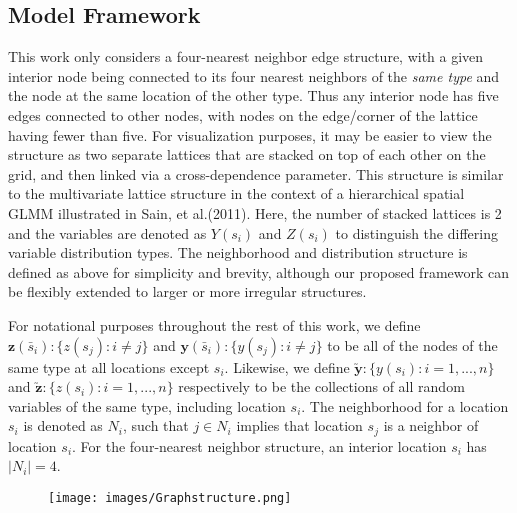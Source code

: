 \documentclass[12pt, a4paper, twoside]{article}
\begin{document}
\subsection{Model Framework}\label{framework}
This work only considers a four-nearest neighbor edge structure, with a given interior node being connected to its four nearest neighbors of the \textit{same type} and the node at the same location of the other type. Thus any interior node has five edges connected to other nodes, with nodes on the edge/corner of the lattice having fewer than five. For visualization purposes, it may be easier to view the structure as two separate lattices that are stacked on top of each other on the grid, and then linked via a cross-dependence parameter. This structure is similar to the multivariate lattice structure in the context of a hierarchical spatial GLMM illustrated in Sain, et al.(2011). Here, the number of stacked lattices is 2 and the variables are denoted as $Y(s_i)$ and $Z(s_i)$ to distinguish the differing variable distribution types. The neighborhood and distribution structure is defined as above for simplicity and brevity, although our proposed framework can be flexibly extended to larger or more irregular structures.

For notational purposes throughout the rest of this work, we define $\boldsymbol{z}(\bar{s}_i):\lbrace z(s_j):i\neq j\rbrace$ and $\boldsymbol{y}(\bar{s}_i):\lbrace y(s_j):i\neq j\rbrace$ to be all of the nodes of the same type at all locations except $s_i$. Likewise, we define $\boldsymbol{\utilde{y}} : \lbrace y(s_i):i = 1,...,n\rbrace $ and $\boldsymbol{\utilde{z}} : \lbrace z(s_i):i = 1,...,n\rbrace$ respectively to be the collections of all random variables of the same type, including location $s_i$. The neighborhood for a location $s_i$ is denoted as $N_i$, such that $j \in N_i$ implies that location $s_j$ is a neighbor of location $s_i$. For the four-nearest neighbor structure, an interior location $s_i$ has $|N_i|=4$.
\begin{figure}[h]
	\centering
	\texttt{[image: images/Graphstructure.png]}
\end{figure}
\end{document}
